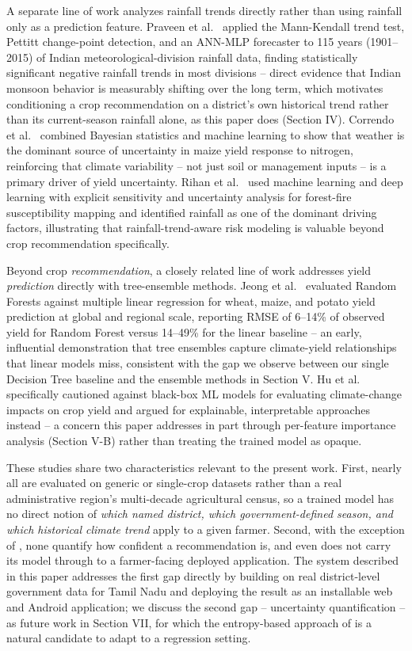 \documentclass[conference]{IEEEtran}
\begin{document}
A separate line of work analyzes rainfall trends directly rather than using rainfall
only as a prediction feature. Praveen et al.~\cite{praveen2020} applied the
Mann-Kendall trend test, Pettitt change-point detection, and an ANN-MLP forecaster to
115 years (1901--2015) of Indian meteorological-division rainfall data, finding
statistically significant negative rainfall trends in most divisions -- direct
evidence that Indian monsoon behavior is measurably shifting over the long term, which
motivates conditioning a crop recommendation on a district's own historical trend
rather than its current-season rainfall alone, as this paper does (Section IV).
Correndo et al.~\cite{correndo2021} combined Bayesian statistics and machine learning
to show that weather is the dominant source of uncertainty in maize yield response to
nitrogen, reinforcing that climate variability -- not just soil or management inputs
-- is a primary driver of yield uncertainty. Rihan et al.~\cite{rihan2023} used
machine learning and deep learning with explicit sensitivity and uncertainty analysis
for forest-fire susceptibility mapping and identified rainfall as one of the dominant
driving factors, illustrating that rainfall-trend-aware risk modeling is valuable
beyond crop recommendation specifically.

Beyond crop \emph{recommendation}, a closely related line of work addresses yield
\emph{prediction} directly with tree-ensemble methods. Jeong et al.~\cite{jeong2016}
evaluated Random Forests against multiple linear regression for wheat, maize, and
potato yield prediction at global and regional scale, reporting RMSE of 6--14\% of
observed yield for Random Forest versus 14--49\% for the linear baseline -- an early,
influential demonstration that tree ensembles capture climate-yield relationships that
linear models miss, consistent with the gap we observe between our single Decision
Tree baseline and the ensemble methods in Section V. Hu et al.~\cite{hu2023}
specifically cautioned against black-box ML models for evaluating climate-change
impacts on crop yield and argued for explainable, interpretable approaches instead --
a concern this paper addresses in part through per-feature importance analysis
(Section V-B) rather than treating the trained model as opaque.

These studies share two characteristics relevant to the present work. First, nearly
all are evaluated on generic or single-crop datasets rather than a real administrative
region's multi-decade agricultural census, so a trained model has no direct notion of
\emph{which named district, which government-defined season, and which historical
climate trend} apply to a given farmer. Second, with the exception of
\cite{alam2025}, none quantify how confident a recommendation is, and even
\cite{alam2025} does not carry its model through to a farmer-facing deployed
application. The system described in this paper addresses the first gap directly by
building on real district-level government data for Tamil Nadu and deploying the
result as an installable web and Android application; we discuss the second gap --
uncertainty quantification -- as future work in Section VII, for which the
entropy-based approach of \cite{alam2025} is a natural candidate to adapt to a
regression setting.
\end{document}
